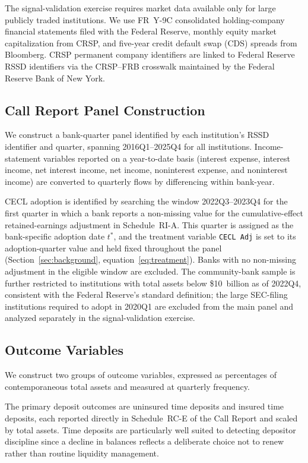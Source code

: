 The signal-validation exercise requires market data available only for large
publicly traded institutions. We use FR~Y-9C consolidated holding-company
financial statements filed with the Federal Reserve, monthly equity market
capitalization from CRSP, and five-year credit default swap (CDS) spreads from
Bloomberg. CRSP permanent company identifiers are linked to Federal Reserve RSSD
identifiers via the CRSP--FRB crosswalk maintained by the Federal Reserve Bank
of New York.

\subsection{Call Report Panel Construction}
\label{sec:data:panel}

We construct a bank-quarter panel identified by each institution's RSSD identifier
and quarter, spanning 2016Q1--2025Q4 for all institutions. Income-statement
variables reported on a year-to-date basis (interest expense, interest income,
net interest income, net income, noninterest expense, and noninterest income) are
converted to quarterly flows by differencing within bank-year.

CECL adoption is identified by searching the window 2022Q3--2023Q4 for the
first quarter in which a bank reports a non-missing value for the
cumulative-effect retained-earnings adjustment in Schedule~RI-A. This quarter is
assigned as the bank-specific adoption date $t^{*}$, and the treatment variable
\texttt{CECL Adj} is set to its adoption-quarter value and held fixed
throughout the panel (Section~\ref{sec:background}, equation~\eqref{eq:treatment}).
Banks with no non-missing adjustment in the eligible window are excluded. The
community-bank sample is further restricted to institutions with total assets
below \$10~billion as of 2022Q4, consistent with the Federal Reserve's standard
definition; the large SEC-filing institutions required to adopt in 2020Q1 are
excluded from the main panel and analyzed separately in the signal-validation
exercise.

\subsection{Outcome Variables}
\label{sec:data:outcomes}

We construct two groups of outcome variables, expressed as percentages of
contemporaneous total assets and measured at quarterly frequency.

The primary deposit outcomes are uninsured time deposits and insured time
deposits, each reported directly in Schedule~RC-E of the Call Report and scaled
by total assets. Time deposits are particularly well suited to detecting
depositor discipline since a decline in balances reflects a deliberate choice not 
to renew rather than routine liquidity management.

